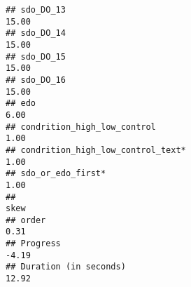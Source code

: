 \documentclass[
]{article}
\begin{document}
\begin{verbatim}
## sdo_DO_13                                                                                                                                                                                                                     15.00
## sdo_DO_14                                                                                                                                                                                                                     15.00
## sdo_DO_15                                                                                                                                                                                                                     15.00
## sdo_DO_16                                                                                                                                                                                                                     15.00
## edo                                                                                                                                                                                                                            6.00
## condrition_high_low_control                                                                                                                                                                                                    1.00
## condrition_high_low_control_text*                                                                                                                                                                                              1.00
## sdo_or_edo_first*                                                                                                                                                                                                              1.00
##                                                                                                                                                                                                                              skew
## order                                                                                                                                                                                                                        0.31
## Progress                                                                                                                                                                                                                    -4.19
## Duration (in seconds)                                                                                                                                                                                                       12.92

\end{verbatim}
\end{document}
